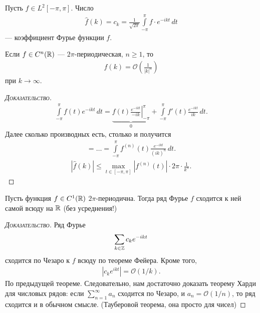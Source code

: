 \documentclass[../complex-analysis.tex]{subfiles}
\begin{document}
\begin{df}
 Пусть $ f \in L^{2}[-\pi,\pi] $. Число
 \begin{align*}
  \hat f(k) = c_k = \frac{1}{\sqrt{2\pi}} \int\limits_{-\pi}^{\pi} f \cdot e^{-ikt}\,dt
 \end{align*} --- коэффициент Фурье функции $ f $.
\end{df}

\begin{thm}
 Если $ f \in C^{n}(\mathbb{R}) $ --- $ 2\pi $-периодическая, $ n \geqslant 1 $, то 
 \begin{align*}
  \hat f(k) = \mathcal O\left( \frac{1}{\left| k \right|^{n}}\right)
 \end{align*} при $ k \to \infty $.
\end{thm}
\begin{proof}[\normalfont\textsc{Доказательство}]
 \begin{align*}
  \int\limits_{-\pi}^{\pi} f(t)e^{-ikt}\,dt = \underbrace{f(t) \left.\frac{e^{-ikt}}{-ik}\right|_{-\pi}^{\pi}}_{0} + \int\limits_{-\pi}^{\pi} f'(t) \frac{e^{-ikt}}{ik}\,dt.
 \end{align*} Далее сколько производных есть, столько и получится
 \begin{align*}
  = \ldots = \int\limits_{-\pi}^{\pi} f^{(n)}(t) \frac{ e^{-ikt}}{(ik)^{n}}\,dt.
 \end{align*}
 \begin{align*}
  \left| \hat f(k) \right| \leqslant \max_{t \in [-\pi,\pi]} \left| f^{(n)}(t) \right| \cdot 2\pi \cdot \frac{1}{k^{n}}.
 \end{align*}
\end{proof}

\begin{thm}[Харди]
 Пусть функция $ f \in C^{1}(\mathbb{R}) $ $ 2\pi $-периодична. Тогда ряд Фурье $ f $ сходится к ней самой всюду на $ \mathbb{R} $ (без усреднения!)
\end{thm}
\begin{proof}[\normalfont\textsc{Доказательство}]
 Ряд Фурье
 \begin{align*}
  \sum_{k \in \mathbb{Z}}c_k e^{-ikt}
 \end{align*} сходится по Чезаро к $ f $ всюду по теореме Фейера. Кроме того,
 \begin{align*}
  \left| c_ke^{ikt} \right| = \mathcal O(1 / k).
 \end{align*} По предыдущей теореме. Следовательно, нам достаточно доказать теорему Харди для числовых рядов: если $ \sum_{n=1}^{\infty} a_n $ сходится по Чезаро, и $ a_n = \mathcal O(1 / n) $, то ряд сходится и в обычном смысле. (Тауберовой теорема, она просто для чисел)
\end{proof}
\end{document}
